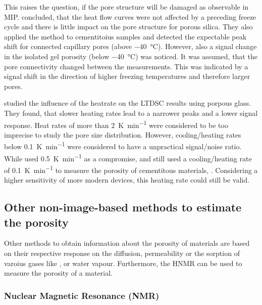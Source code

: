 This raises the question, if the pore structure will be damaged as observable in \ac{MIP}.
\Textcite{wu.2015} concluded, that the heat flow curves were not affected by a preceding freeze cycle and there is little impact on the pore structure for porous silica.
They also applied the method to cementitoius samples and detected the expectable peak shift for connected capillary pores (above \SI{-40}{\degreeCelsius}).
However, also a signal change in the isolated gel porosity (below \SI{-40}{\degreeCelsius}) was noticed.
It was assumed, that the pore connectivity changed between the measurements.
This was indicated by a signal shift in the direction of higher freezing temperatures and therefore larger pores.

\Textcite{neffati.2001} studied the influence of the heatrate on the \ac{LTDSC} results using porpous glass.
They found, that slower heating rates lead to a narrower peaks and a lower signal response.
Heat rates of more than \SI{2}{\kelvin\per\minute} were considered to be too imprecise to study the pore size distribution.%
However, cooling/heating rates below \SI{0.1}{\kelvin\per\minute} were considered to have a unpractical signal/noise ratio.
While \textcite{joseph.2024} used \SI{0.5}{\kelvin\per\minute} as a compromise, \textcite{wu.2015} and \textcite{ghantous.2023} still used a cooling/heating rate of \SI{0.1}{\kelvin\per\minute} to measure the porosity of cementitous materials, .
{\color{red}Considering a higher sensitivity of more modern devices, this heating rate could still be valid.}

\subsection{Other non-image-based methods to estimate the porosity}
\label{subsec:other_porosity}

Other methods to obtain information about the porosity of materials are based on their respective response on the diffusion, permeability or the sorption of varoius gases like ,  or water vapour.
Furthermore, the \ac{HNMR} can be used to measure the porosity of a material.

\subsubsection{ Nuclear Magnetic Resonance (\acs{NMR})}

